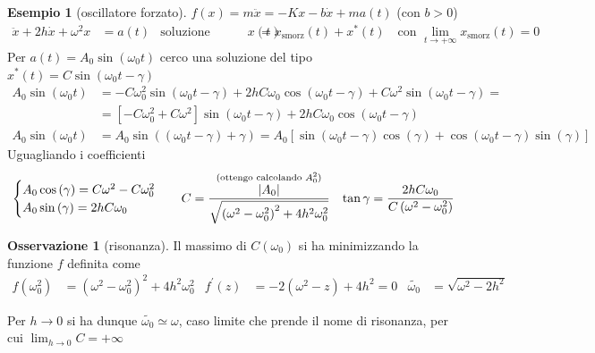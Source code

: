 \documentclass[a4paper,10pt]{article}
\theoremstyle{definition}
\theoremstyle{indentdefinition}
\theoremstyle{indenttheorem}
\theoremstyle{myremark}
\newtheorem*{rem*}{Osservazione}
\newtheorem{example*}{Esempio}
\theoremstyle{indentgeneral}
\begin{document}
\begin{example*}[oscillatore forzato]
\label{exa:oscillatore-forzato}$f\left(x\right)=m\ddot{x}=-Kx-b\dot{x}+ma\left(t\right)$
(con $b>0$)
\begin{align*}
\ddot{x}+2h\dot{x}+\omega^{2}x & =a\left(t\right) & \text{soluzione generale }x\left(t\right) & =x_{\text{smorz}}\left(t\right)+x^{*}\left(t\right)\quad\text{con }\lim_{t\rightarrow+\infty}x_{\text{smorz}}\left(t\right)=0
\end{align*}
Per $a\left(t\right)=A_{0}\sin\left(\omega_{0}t\right)$ cerco una
soluzione del tipo $x^{*}\left(t\right)=C\sin\left(\omega_{0}t-\gamma\right)$
\begin{align*}
A_{0}\sin\left(\omega_{0}t\right) & =-C\omega_{0}^{2}\sin\left(\omega_{0}t-\gamma\right)+2hC\omega_{0}\cos\left(\omega_{0}t-\gamma\right)+C\omega^{2}\sin\left(\omega_{0}t-\gamma\right)=\\
 & =\left[-C\omega_{0}^{2}+C\omega^{2}\right]\sin\left(\omega_{0}t-\gamma\right)+2hC\omega_{0}\cos\left(\omega_{0}t-\gamma\right)\\
A_{0}\sin\left(\omega_{0}t\right) & =A_{0}\sin\left(\left(\omega_{0}t-\gamma\right)+\gamma\right)=A_{0}\left[\sin\left(\omega_{0}t-\gamma\right)\cos\left(\gamma\right)+\cos\left(\omega_{0}t-\gamma\right)\sin\left(\gamma\right)\right]
\end{align*}
Uguagliando i coefficienti
\begin{align*}
 & \begin{cases}
A_{0}\cos\left(\gamma\right)=C\omega^{2}-C\omega_{0}^{2}\\
A_{0}\sin\left(\gamma\right)=2hC\omega_{0}
\end{cases} & C & =\overset{\text{(ottengo calcolando \ensuremath{A_{0}^{2}})}}{\frac{\left|A_{0}\right|}{\sqrt{\left(\omega^{2}-\omega_{0}^{2}\right)^{2}+4h^{2}\omega_{0}^{2}}}} & \tan\gamma=\frac{2hC\omega_{0}}{C\left(\omega^{2}-\omega_{0}^{2}\right)}
\end{align*}
\end{example*}
\begin{rem*}[risonanza]
Il massimo di $C\left(\omega_{0}\right)$ si ha minimizzando la funzione
$f$ definita come
\begin{align*}
f\left(\omega_{0}^{2}\right) & =\left(\omega^{2}-\omega_{0}^{2}\right)^{2}+4h^{2}\omega_{0}^{2} & f^{\prime}\left(z\right) & =-2\left(\omega^{2}-z\right)+4h^{2}=0 & \widetilde{\omega_{0}} & =\sqrt{\omega^{2}-2h^{2}}
\end{align*}

Per $h\rightarrow0$ si ha dunque $\widetilde{\omega_{0}}\simeq\omega$,
caso limite che prende il nome di risonanza, per cui $\lim_{h\rightarrow0}C=+\infty$
\end{rem*}
\end{document}
